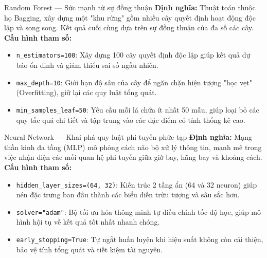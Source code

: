 \begin{frame}{Random Forest --- Sức mạnh từ sự đồng thuận}
  \textbf{Định nghĩa:} Thuật toán thuộc họ Bagging, xây dựng một "khu rừng" gồm nhiều cây quyết định hoạt động độc lập và song song. Kết quả cuối cùng dựa trên sự đồng thuận của đa số các cây.
  \vspace{2mm}
  \\
  \textbf{Cấu hình tham số:}
  \begin{itemize}
    \item \texttt{n\_estimators=100}: Xây dựng 100 cây quyết định độc lập giúp kết quả dự báo ổn định và giảm thiểu sai số ngẫu nhiên.
    \item \texttt{max\_depth=10}: Giới hạn độ sâu của cây để ngăn chặn hiện tượng "học vẹt" (Overfitting), giữ lại các quy luật tổng quát.
    \item \texttt{min\_samples\_leaf=50}: Yêu cầu mỗi lá chứa ít nhất 50 mẫu, giúp loại bỏ các quy tắc quá chi tiết và tập trung vào các đặc điểm có tính thống kê cao.
  \end{itemize}
\end{frame}

\begin{frame}{Neural Network --- Khai phá quy luật phi tuyến phức tạp}
  \textbf{Định nghĩa:} Mạng thần kinh đa tầng (MLP) mô phỏng cách não bộ xử lý thông tin, mạnh mẽ trong việc nhận diện các mối quan hệ phi tuyến giữa giờ bay, hãng bay và khoảng cách.
  \vspace{2mm}
  \\
  \textbf{Cấu hình tham số:}
  \begin{itemize}
    \item \texttt{hidden\_layer\_sizes=(64, 32)}: Kiến trúc 2 tầng ẩn (64 và 32 neuron) giúp nén đặc trưng ban đầu thành các biểu diễn trừu tượng và sâu sắc hơn.
    \item \texttt{solver="adam"}: Bộ tối ưu hóa thông minh tự điều chỉnh tốc độ học, giúp mô hình hội tụ về kết quả tốt nhất nhanh chóng.
    \item \texttt{early\_stopping=True}: Tự ngắt huấn luyện khi hiệu suất không còn cải thiện, bảo vệ tính tổng quát và tiết kiệm tài nguyên.
  \end{itemize}
\end{frame}


